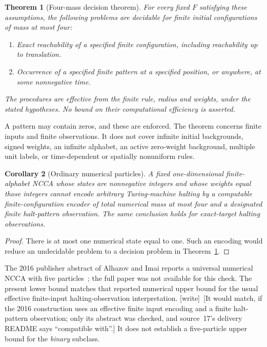 \documentclass[11pt,letterpaper]{article}
\numberwithin{equation}{section}
\newtheorem{theorem}{Theorem}[section]
\newtheorem{corollary}[theorem]{Corollary}
\theoremstyle{definition}
\theoremstyle{remark}
\newcommand{\wtag}{\textup{[write]}}
\begin{document}
\begin{theorem}[Four-mass decision theorem]\label{smc:fm:thm:main}
For every fixed $F$ satisfying these assumptions, the following problems are
decidable for finite initial configurations of mass at most four:
\begin{enumerate}
\item Exact reachability of a specified finite configuration, including
reachability up to translation.
\item Occurrence of a specified finite pattern at a specified position, or
anywhere, at some nonnegative time.
\end{enumerate}
The procedures are effective from the finite rule, radius and weights, under
the stated hypotheses. No bound on their computational efficiency is asserted.
\end{theorem}

A pattern may contain zeros, and these are enforced. The theorem concerns
finite inputs and finite observations. It does not cover infinite initial
backgrounds, signed weights, an infinite alphabet, an active zero-weight
background, multiple unit labels, or time-dependent or spatially nonuniform
rules.

\begin{corollary}[Ordinary numerical particles]\label{smc:fm:cor:numerical}
A fixed one-dimensional finite-alphabet NCCA whose states are nonnegative
integers and whose weights equal those integers cannot encode arbitrary
Turing-machine halting by a computable finite-configuration encoder of total
numerical mass at most four and a designated finite halt-pattern observation.
The same conclusion holds for exact-target halting observations.
\end{corollary}
\begin{proof}
There is at most one numerical state equal to one. Such an encoding would reduce
an undecidable problem to a decision problem in Theorem~\ref{smc:fm:thm:main}.
\end{proof}

The 2016 publisher abstract of Alhazov and Imai reports a universal numerical
NCCA with five particles~\cite{alhazovimai}; the full paper was not available
for this check. The present lower bound matches that reported numerical upper
bound for the usual effective finite-input halting-observation interpretation.
\wtag\ [It would match, if the 2016 construction uses an effective finite input encoding and a finite halt-pattern observation; only its abstract was checked, and source~17's delivery README says ``compatible with''.]
It does not establish a five-particle upper bound for the \emph{binary} subclass.
\end{document}
